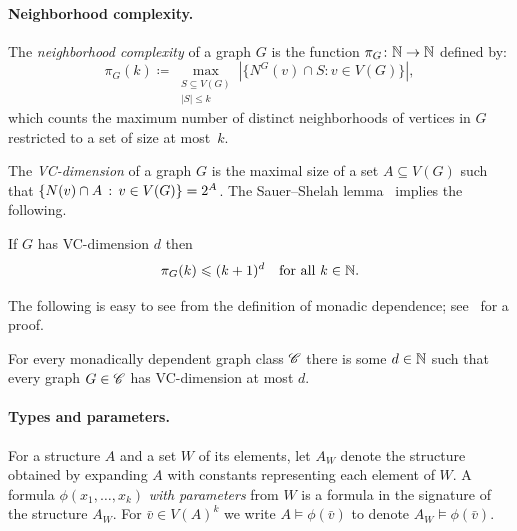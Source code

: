 \paragraph{Neighborhood complexity.}
The \emph{neighborhood complexity} of a graph $G$ is the function $\pi_G\colon\mathbb N\to\mathbb N$ defined by:
\[
    \pi_G(k) \coloneqq
    \max_{\substack{S\subseteq V(G)\\|S|\le k}}
    \left|\{N^G(v)\cap S:v\in V(G)\}\right|,
\]
 which counts the maximum number of distinct neighborhoods of vertices in $G$ restricted to a set of size at most~$k$.

The \emph{VC-dimension} of a graph $G$ is the maximal size of a set $A\subseteq V(G)$ such that $\{N(v)\cap A \,:\, v\in V(G) \}=2^A$. The Sauer--Shelah lemma~\cite{Sauer72,She72} implies the following.
\begin{lemma}\label{lem:ss}
  If $G$ has VC-dimension $d$ then 
  $$\pi_G(k)\leqslant (k+1)^d\quad\text{for all }k\in\mathbb N.$$
\end{lemma}
The following is easy to see from the definition of monadic dependence; see~\cite[Observation~3.2]{md-abmw} for a proof.
\begin{observation}\label{obs:md-vc}
For every monadically dependent graph class $\mathscr C$ there is some $d\in\mathbb N$ 
such that every graph $G\in\mathscr C$ has VC-dimension at most $d$.
\end{observation}

 


\paragraph{Types and parameters.}
For a structure $A$ and a set $W$ of its elements, 
let $A_W$ denote the structure obtained by expanding $A$  with constants representing each element of $W$. 
A formula $\phi(x_1,\ldots,x_k)$ \emph{with parameters} from $W$ is a formula in the signature of the structure $A_W$.
For $\bar v\in V(A)^k$ we write $A\models\phi(\bar v)$ to denote $A_W\models\phi(\bar v)$.

